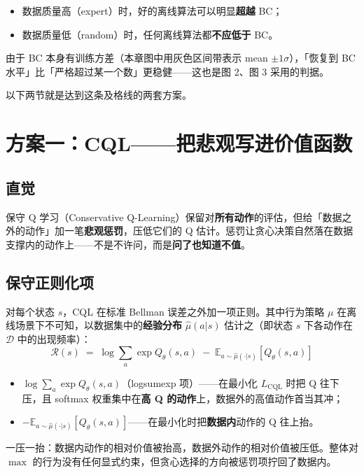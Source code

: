 \documentclass{article}
\begin{document}
\begin{itemize}
  \item 数据质量高（expert）时，好的离线算法可以明显\textbf{超越} BC；
  \item 数据质量低（random）时，任何离线算法都\textbf{不应低于} BC。
\end{itemize}

由于 BC 本身有训练方差（本章图中用灰色区间带表示 mean $\pm 1\sigma$），「恢复到 BC 水平」比「严格超过某一个数」更稳健——这也是图 2、图 3 采用的判据。

以下两节就是达到这条及格线的两套方案。

\section*{方案一：CQL——把悲观写进价值函数}

\subsection*{直觉}

保守 Q 学习（Conservative Q-Learning）保留对\textbf{所有动作}的评估，但给「数据之外的动作」加一笔\textbf{悲观惩罚}，压低它们的 Q 估计。惩罚让贪心决策自然落在数据支撑内的动作上——不是不许问，而是\textbf{问了也知道不值}。

\subsection*{保守正则化项}

对每个状态 $s$，CQL 在标准 Bellman 误差之外加一项正则。其中行为策略 $\mu$ 在离线场景下不可知，以数据集中的\textbf{经验分布} $\hat\mu(a|s)$ 估计之（即状态 $s$ 下各动作在 $\mathcal{D}$ 中的出现频率）：
\[
\boxed{\mathcal{R}(s) \;=\; \log\sum_{a}\exp Q_\theta(s,a) \;-\; \mathbb{E}_{a\sim\hat\mu(\cdot|s)}\!\left[Q_\theta(s,a)\right]}
\]

\begin{itemize}
  \item $\log\sum_a\exp Q_\theta(s,a)$（logsumexp 项）——在最小化 $L_\text{CQL}$ 时把 Q 往下压，且 softmax 权重集中在\textbf{高 Q 的动作}上，数据外的高值动作首当其冲；
  \item $-\mathbb{E}_{a\sim\hat\mu(\cdot|s)}[Q_\theta(s,a)]$——在最小化时把\textbf{数据内}动作的 Q 往上抬。
\end{itemize}

一压一抬：数据内动作的相对价值被抬高，数据外动作的相对价值被压低。整体对 $\max$ 的行为没有任何显式约束，但贪心选择的方向被惩罚项拧回了数据内。
\end{document}
